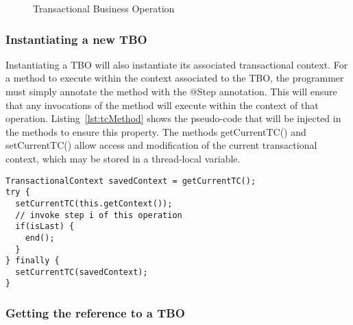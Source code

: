 \documentclass{llncs}
\begin{document}
\begin{figure}
  \centering

\caption{Transactional Business Operation}
\label{fig:TBO}

\end{figure}

\subsubsection{Instantiating a new TBO}

Instantiating a TBO will also instantiate its associated transactional
context. For a method to execute within the context associated to the
TBO, the programmer must simply annotate the method with the @Step
annotation. This will ensure that any invocations of the method will
execute within the context of that
operation. Listing~\ref{lst:tcMethod} shows the pseudo-code that will
be injected in the methods to ensure this property. The methods
getCurrentTC() and setCurrentTC() allow access and modification of the
current transactional context, which may be stored in a thread-local
variable.

\begin{lstlisting}[float]
TransactionalContext savedContext = getCurrentTC();
try {
  setCurrentTC(this.getContext());
  // invoke step i of this operation
  if(isLast) {
    end();
  }
} finally {
  setCurrentTC(savedContext);
}
\end{lstlisting}

\subsubsection{Getting the reference to a TBO}
\end{document}
